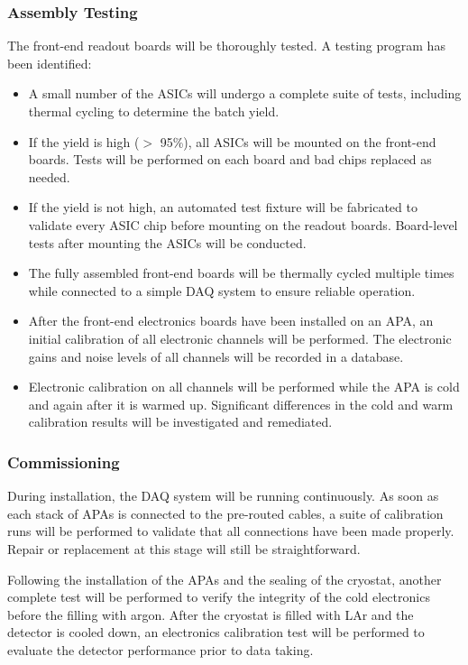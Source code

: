 \subsubsection{Assembly Testing}
\label{subsubsec:ce_install_assembly}

The front-end readout boards will be thoroughly tested. A testing program has been identified:
\begin{itemize}
\item A small number of the ASICs will undergo a complete suite 
of tests, including thermal cycling to determine the batch yield.
\item If the yield is high ($>$ 95\%), all ASICs will be mounted 
on the front-end boards.
Tests will be performed on each board and bad chips replaced as needed.
\item If the yield is not high, an automated test fixture will be 
fabricated to validate every ASIC chip before mounting on the readout boards.
Board-level tests after mounting the ASICs will be conducted.
\item The fully assembled front-end boards will be thermally cycled multiple times while connected
to a simple DAQ system to ensure reliable operation.
\item After the front-end electronics boards have been installed on an APA,
an initial calibration of all electronic channels will be performed.
The electronic gains and noise levels of all channels will be recorded in a database.
\item Electronic calibration on all channels will be performed while the APA is cold and again after it is warmed up.
Significant differences in the cold and warm calibration results will be investigated and remediated.  
\end{itemize}

%
\subsubsection{Commissioning } 
\label{subsubsec:ce_install_commission}

During installation, the DAQ system will be running continuously.
As soon as each stack of APAs is connected to the pre-routed cables, 
a suite of calibration runs will be performed to validate that all connections have been made properly.
Repair or replacement at this stage will still be straightforward.

Following the installation of the APAs and the sealing of the cryostat,
another complete test will be performed to verify the integrity of the cold electronics before the filling with argon.
After the cryostat is filled with LAr and the detector is cooled down,
an electronics calibration test will be performed to evaluate
the detector performance prior to data taking.

%

